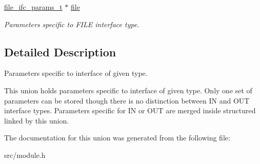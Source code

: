 \begin{DoxyCompactItemize}
\mbox{\label{unionspecific__ifc__params__u_aef8c1bf33fcc994f872f4685370417be}} 
\hyperlink{structfile__ifc__params__s}{file\+\_\+ifc\+\_\+params\+\_\+t} $\ast$ \hyperlink{unionspecific__ifc__params__u_aef8c1bf33fcc994f872f4685370417be}{file}
\begin{DoxyCompactList}\small\item\em Parameters specific to F\+I\+LE interface type. \end{DoxyCompactList}\end{DoxyCompactItemize}


\subsection{Detailed Description}
Parameters specific to interface of given type. 

This union holds parameters specific to interface of given type. Only one set of parameters can be stored though there is no distinction between IN and O\+UT interface types. Parameters specific for IN or O\+UT are merged inside structured linked by this union. 

The documentation for this union was generated from the following file\+:\begin{DoxyCompactItemize}
\item 
src/module.\+h\end{DoxyCompactItemize}
